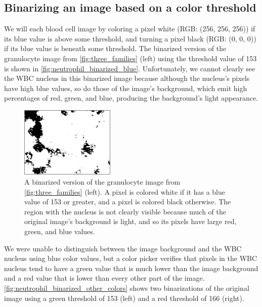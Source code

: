 \FloatBarrier
{}
\subsection{Binarizing an image based on a color threshold}

We will  each blood cell image by coloring a pixel white (RGB: (256, 256, 256)) if its blue value is above some threshold, and turning a pixel black (RGB: (0, 0, 0)) if its blue value is beneath some threshold. The binarized version of the granulocyte image from \autoref{fig:three_families} (left) using the threshold value of 153 is shown in \autoref{fig:neutrophil_binarized_blue}. Unfortunately, we cannot clearly see the WBC nucleus in this binarized image because although the nucleus's pixels have high blue values, so do those of the image's background, which emit high percentages of red, green, and blue, producing the background's light appearance.\\

\begin{figure}[h]
\centering
\mySfFamily
\includegraphics[width = 0.4\textwidth]{../images/neutrophil_binarized_blue.png}
\caption{A binarized version of the granulocyte image from \autoref{fig:three_families} (left). A pixel is colored white if it has a blue value of 153 or greater, and a pixel is colored black otherwise. The region with the nucleus is not clearly visible because much of the original image's background is light, and so its pixels have large red, green, and blue values.}
\label{fig:neutrophil_binarized_blue}
\end{figure}

\begin{qbox}\end{qbox}

We were unable to distinguish between the image background and the WBC nucleus using blue color values, but a color picker verifies that pixels in the WBC nucleus tend to have a green value that is much lower than the image background and a red value that is lower than every other part of the image. \autoref{fig:neutrophil_binarized_other_colors} shows two binarizations of the original image using a green threshold of 153 (left) and a red threshold of 166 (right).\\

